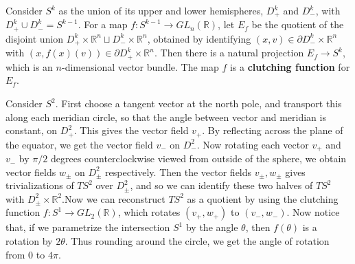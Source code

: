 \begin{defn} Consider $S^k$ as the union of its upper and lower hemispheres, $D_+^k$ and $D_-^k$, with $D_+^k\cup D_-^k=S^{k-1}$. For a map $f:S^{k-1}\rightarrow GL_n(\mathbb{R})$, let $E_f$ be the quotient of the disjoint union $D_+^k\times \mathbb{R}^n\sqcup D_-^k\times \mathbb{R}^n$, obtained by identifying $(x,v)\in \partial D_-^k\times \mathbb{R}^n$ with $(x,f(x)(v))\in \partial D_+^k\times \mathbb{R}^n$. Then there is a natural projection $E_f\rightarrow S^k$, which is an $n$-dimensional vector bundle. The map $f$ is a \textbf{clutching function} for $E_f$.
\end{defn}

\begin{exmp} Consider $S^2$. First choose a tangent vector at the north pole, and transport this along each meridian circle, so that the angle between vector and meridian is constant, on $D_+^2$. This gives the vector field $v_+$. By reflecting across the plane of the equator, we get the vector field $v_-$ on $D_-^2$. Now rotating each vector $v_+$ and $v_-$ by $\pi/2$ degrees counterclockwise viewed from outside of the sphere, we obtain vector fields $w_\pm$ on $D_\pm^2$ respectively. Then the vector fields $v_\pm, w_\pm$ gives trivializations of $TS^2$ over $D_\pm^2$, and so we can identify these two halves of $TS^2$ with $D_\pm^2\times \mathbb{R}^2$.Now we can reconstruct $TS^2$ as a quotient by using the clutching function $f:S^1\rightarrow GL_2(\mathbb{R})$, which rotates $(v_+,w_+)$ to $(v_-,w_-)$. Now notice that, if we parametrize the intersection $S^1$ by the angle $\theta$, then $f(\theta)$ is a rotation by $2\theta$. Thus rounding around the circle, we get the angle of rotation from $0$ to $4\pi$.
\end{exmp}

